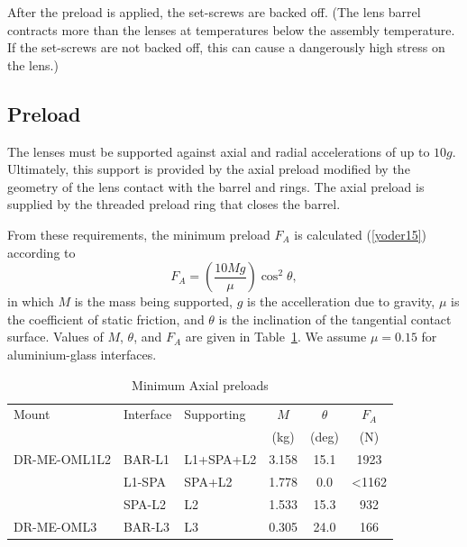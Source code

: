 \documentclass{article}
\renewcommand{\deg}{\mbox{deg}}
\begin{document}
After the preload is applied, the set-screws are backed off. (The lens barrel contracts more than the lenses at temperatures below the assembly temperature. If the set-screws are not backed off, this can cause a dangerously high stress on the lens.)

\subsection{Preload}

The lenses must be supported against axial and radial accelerations of up to $10g$. Ultimately, this support is provided by the axial preload modified by the geometry of the lens contact with the barrel and rings. The axial preload is supplied by the threaded preload ring that closes the barrel.

From these requirements, the minimum preload $F_A$ is calculated (\ref{yoder15}) according to 
\begin{equation}
F_A = \left(\frac{10Mg}{\mu}\right) \cos^2\theta,
\end{equation}
in which $M$ is the mass being supported, $g$ is the accelleration due to gravity, $\mu$ is the coefficient of static friction, and $\theta$ is the inclination of the tangential contact surface. Values of $M$, $\theta$, and $F_A$ are given in Table~\ref{table:minimum-preloads}. We assume $\mu = 0.15$ for aluminium-glass interfaces.

\begin{table}
\caption{Minimum Axial preloads}
\label{table:minimum-preloads}
\begin{center}
\small
\begin{tabular}{lllccc}
\hline
\hline
Mount&Interface&Supporting&$$M$$&$\theta$&$F_A$\\
&&&(kg)&(\deg)&(N)\\
\hline
DR-ME-OML1L2&BAR-L1&L1+SPA+L2 &3.158&\phantom{}15.1&\phantom{<}1923\\
            &L1-SPA&SPA+L2    &1.778&\phantom{0}0.0&\phantom{}<1162\\
            &SPA-L2&L2        &1.533&\phantom{}15.3&\phantom{<0}932\\
\hline
DR-ME-OML3  &BAR-L3&L3        &0.305&\phantom{}24.0&\phantom{<0}166\\
\hline
\end{tabular}
\end{center}
\end{table}
\end{document}
